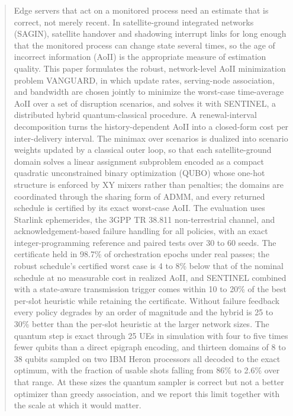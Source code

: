 
\begin{abstract}
Edge servers that act on a monitored process need an estimate that is correct, not merely recent. In
satellite-ground integrated networks (SAGIN), satellite handover and shadowing interrupt links for long enough that the
monitored process can change state several times, so the age of incorrect information (AoII) is the appropriate
measure of estimation quality. This paper formulates the robust, network-level AoII minimization problem VANGUARD, in
which update rates, serving-node association, and bandwidth are chosen jointly to minimize the worst-case time-average
AoII over a set of disruption scenarios, and solves it with SENTINEL, a distributed hybrid quantum-classical procedure.
A renewal-interval decomposition turns the history-dependent AoII into a closed-form cost per inter-delivery
interval. The minimax over scenarios is dualized into scenario weights updated by a classical outer loop, so that each
satellite-ground domain solves a linear assignment subproblem encoded as a compact quadratic unconstrained binary
optimization (QUBO) whose one-hot structure is enforced by XY mixers rather than penalties; the domains are coordinated
through the sharing form of ADMM, and every returned schedule is certified by its exact worst-case AoII. The
evaluation uses Starlink ephemerides, the 3GPP TR 38.811 non-terrestrial channel, and acknowledgement-based failure
handling for all policies, with an exact integer-programming reference and paired tests over 30 to 60 seeds. The
certificate held in 98.7\% of orchestration epochs under real passes; the robust schedule's certified worst case is 4
to 8\% below that of the nominal schedule at no measurable cost in realized AoII, and SENTINEL combined with a
state-aware transmission trigger comes within 10 to 20\% of the best per-slot heuristic while retaining the
certificate. Without failure feedback every policy degrades by an order of magnitude and the hybrid is 25 to 30\%
better than the per-slot heuristic at the larger network sizes. The quantum step is exact through 25 UEs in simulation with four to five times
fewer qubits than a direct epigraph encoding, and thirteen domains of 8 to 38 qubits sampled on two IBM Heron
processors all decoded to the exact optimum, with the fraction of usable shots falling from 86\% to 2.6\% over that
range. At these sizes the quantum sampler is correct but not a better optimizer than greedy association, and we report
this limit together with the scale at which it would matter.
\end{abstract}

